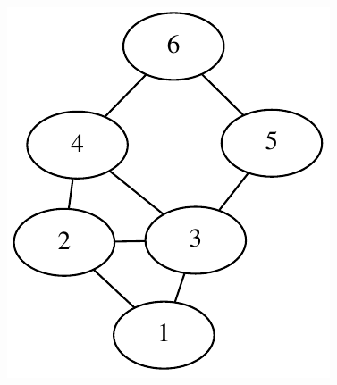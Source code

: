 \documentclass[a4paper, 12pt]{article}
\begin{document}
\begin{figure}[H]
\centering{}
\includegraphics{image/graph2_example2}
\end{figure}
\end{document}
